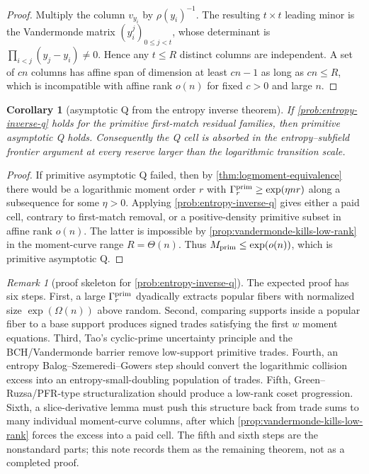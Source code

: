 \documentclass[a4paper,11pt]{amsart}
\newtheorem{corollary}[corollary]{Corollary}
\theoremstyle{remark}
\newtheorem{remark}[remark]{Remark}
\begin{document}
\begin{proof}
Multiply the column \(v_{y_i}\) by \(\rho(y_i)^{-1}\).  The resulting \(t\times t\) leading minor is the Vandermonde matrix \((y_i^{j})_{0\le j<t}\), whose determinant is \(\prod_{i<j}(y_j-y_i)\ne0\).  Hence any \(t\le R\) distinct columns are independent.  A set of \(cn\) columns has affine span of dimension at least \(cn-1\) as long as \(cn\le R\), which is incompatible with affine rank \(o(n)\) for fixed \(c>0\) and large \(n\).
\end{proof}

\begin{corollary}[asymptotic Q from the entropy inverse theorem]\label{cor:asymp-q-from-entropy-inverse}
If \cref{prob:entropy-inverse-q} holds for the primitive first-match residual families, then primitive asymptotic Q holds.  Consequently the Q cell is absorbed in the entropy--subfield frontier argument at every reserve larger than the logarithmic transition scale.
\end{corollary}

\begin{proof}
If primitive asymptotic Q failed, then by \cref{thm:logmoment-equivalence} there would be a logarithmic moment order \(r\) with \(\Gamma_r^{\rm prim}\ge\exp(\eta nr)\) along a subsequence for some \(\eta>0\).  Applying \cref{prob:entropy-inverse-q} gives either a paid cell, contrary to first-match removal, or a positive-density primitive subset in affine rank \(o(n)\).  The latter is impossible by \cref{prop:vandermonde-kills-low-rank} in the moment-curve range \(R=\Theta(n)\).  Thus \(M_{\rm prim}\le\exp(o(n))\), which is primitive asymptotic Q.
\end{proof}

\begin{remark}[proof skeleton for \cref{prob:entropy-inverse-q}]\label{rem:entropy-inverse-skeleton}
The expected proof has six steps.  First, a large \(\Gamma_r^{\rm prim}\) dyadically extracts popular fibers with normalized size \(\exp(\Omega(n))\) above random.  Second, comparing supports inside a popular fiber to a base support produces signed trades satisfying the first \(w\) moment equations.  Third, Tao's cyclic-prime uncertainty principle and the BCH/Vandermonde barrier \cite{Tao05} remove low-support primitive trades.  Fourth, an entropy Balog--Szemeredi--Gowers step should convert the logarithmic collision excess into an entropy-small-doubling population of trades.  Fifth, Green--Ruzsa/PFR-type structuralization should produce a low-rank coset progression.  Sixth, a slice-derivative lemma must push this structure back from trade sums to many individual moment-curve columns, after which \cref{prop:vandermonde-kills-low-rank} forces the excess into a paid cell.  The fifth and sixth steps are the nonstandard parts; this note records them as the remaining theorem, not as a completed proof.
\end{remark}
\end{document}
